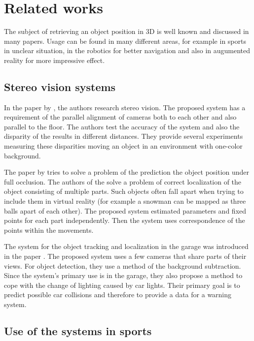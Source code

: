 \chapter{Related works} 

The subject of retrieving an object position in 3D is well known and discussed
in many papers. Usage can be found in many different areas, for example in
sports in unclear situation, in the robotics for better navigation and
also in augumented reality for more impressive effect.

\section{Stereo vision systems}

In the paper by \citet*{zheng2010study}, the authors research stereo vision. The
proposed system has a requirement of the parallel alignment of cameras both to
each other and also parallel to the floor. The authors test the accuracy of the
system and also the disparity of the results in different distances. They
provide several experiments measuring these disparities moving an object in an
environment with one-color background.

The paper by \citet*{black2002multi} tries to solve a problem of the prediction
the object position under full occlusion. The authors of the
\citet*{yonemoto1998tracking} solve a problem of correct localization of the
object consisting of multiple parts. Such objects often fall apart when
trying to include them in virtual reality (for example a snowman can be mapped
as three balls apart of each other). The proposed system estimated parameters and
fixed points for each part independently. Then the system uses correspondence
of the points within the movements.

The system for the object tracking and localization in the garage was introduced
in the paper \citet*{ibisch2015arbitrary}. The proposed system uses a few cameras
that share parts of their views. For object detection, they use a method of the
background subtraction. Since the system's primary use is in the garage, they
also propose a method to cope with the change of lighting caused by car
lights. Their primary goal is to predict possible car collisions and therefore
to provide a data for a warning system.

\section{Use of the systems in sports}

